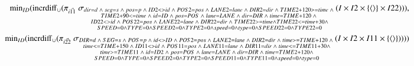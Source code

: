 \begin{eqnarray*}
%
&&\algmin_{ID}(\algincrdiff_{\cup} (\pi_{\vec{i11}} \;\sigma_{\substack{dir = d \;\wedge\; seg = s \;\wedge\; 
pos = p \;\wedge\; ID2 <> id \;\wedge\; POS2 = pos \;\wedge\; LANE2 = lane \;\wedge\; DIR2 = dir \;\wedge\;  TIME2 +120 >= time \;\wedge\;\\ TIME2 + 90 <= time \;\wedge\; id = ID \;\wedge\; pos = POS \;\wedge\;  lane = LANE \;\wedge\; dir=DIR \;\wedge\; time = TIME + 120 \;\wedge\; \\ID22 <> id \;\wedge\; POS22 = pos \;\wedge\;  LANE22 = lane \;\wedge\; DIR22 = dir \;\wedge\; TIME22 >= time \wedge TIME22 <= time + 30 \wedge \\SPEED = 0 \wedge TYPE = 0 \wedge SPEED2 = 0 \wedge TYPE2 = 0 \wedge  speed = 0 \wedge type = 0 \wedge SPEED22 = 0 \wedge TYPE22 =0 }}(I \times  I2 \times  \{\tuple{} \} \times I22))) , \\
%
&&\algmin_{ID}(\algincrdiff_{\cup} (\pi_{\vec{i22}} \;\sigma_{ \substack{DIR = d \;\wedge\; SEG = s \;\wedge\; POS = p \;\wedge\; id <> ID \;\wedge\; POS2 = pos \;\wedge\; LANE2 = lane \;\wedge\; DIR2 = dir \;\wedge\;  time >= TIME + 120  \;\wedge\;\\ time <= TIME + 150 \;\wedge\; ID11 <> id \;\wedge\; POS11 = pos \;\wedge\;  LANE11 = lane \;\wedge\; DIR11= dir \;\wedge\;  time <= TIME11 + 30  \wedge \\time >= TIME11 \;\wedge\; id = ID2 \;\wedge\; pos = POS \;\wedge\;  lane = LANE \;\wedge\; dir = DIR \;\wedge\; time = TIME2 + 120 \wedge \\SPEED = 0 \wedge TYPE = 0 \wedge SPEED2 = 0 \wedge TYPE2 = 0 \wedge  SPEED11 = 0 \wedge TYPE11 = 0 \wedge speed = 0 \wedge type =0 }}(I \times I2 \times I11 \times \{\tuple{} \} ))))
\end{eqnarray*}
%
